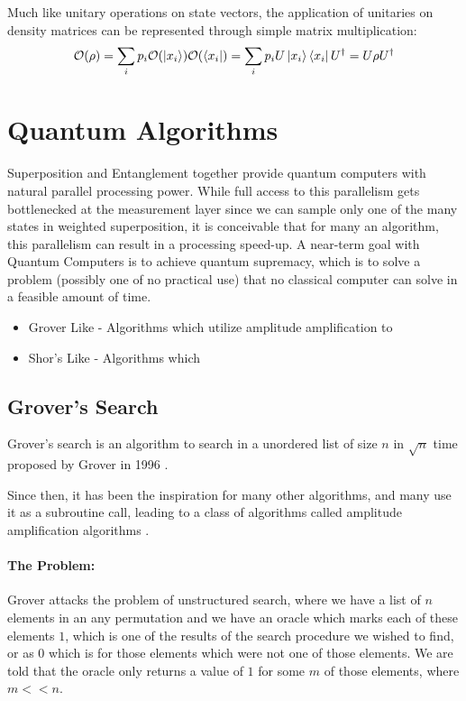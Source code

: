 Much like unitary operations on state vectors, the application of unitaries on density matrices can be represented through simple matrix multiplication:
\begin{equation}
    \mathcal{O} (\rho) = \sum_i p_i \mathcal{O}(\ket{x_i}) \mathcal{O}(\bra{x_i}) = \sum_i p_i U \ket{x_i} \bra{x_i} U^\dagger = U \rho U^\dagger
\end{equation}


\section{Quantum Algorithms}
\label{sec:quantum-algorithms}

Superposition and Entanglement together provide quantum computers with natural parallel processing power. While full access to this parallelism gets bottlenecked at the measurement layer since we can sample only one of the many states in weighted superposition, it is conceivable that for many an algorithm, this parallelism can result in a processing speed-up. A near-term goal with Quantum Computers is to achieve quantum supremacy, which is to solve a problem (possibly one of no practical use) that no classical computer can solve in a feasible amount of time. \cite{quantum-complexity-survey}

\begin{itemize}
    \item Grover Like - Algorithms which utilize amplitude amplification to 
    \item Shor's Like - Algorithms which 
\end{itemize}


\subsection{Grover's Search}

Grover's search is an algorithm to search in a unordered list of size $n$ in $\sqrt{n}$ time proposed by Grover in 1996 \cite{grover-search-original}.

Since then, it has been the inspiration for many other algorithms, and many use it as a subroutine call, leading to a class of algorithms called amplitude amplification algorithms \cite{quantum-amplitude-amplification-algorithms}.

\paragraph*{The Problem:} Grover attacks the problem of unstructured search, where we have a list of $n$ elements in an any permutation and we have an oracle which marks each of these elements $1$, which is one of the results of the search procedure we wished to find, or as $0$ which is for those elements which were not one of those elements. We are told that the oracle only returns a value of $1$ for some $m$ of those elements, where $m << n$.

